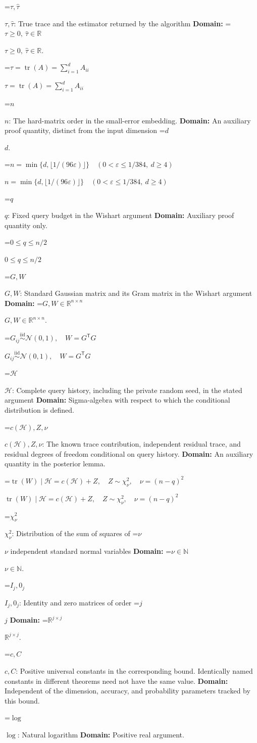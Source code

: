 \documentclass[10pt,a4paper]{article}
\newcommand{\AtlasMath}[1]{\par\begingroup\centering\setbox0=\hbox{$\displaystyle #1$}\ifdim\wd0>1.4\linewidth\typeout{ATLAS WIDE FORMULA: \the\wd0}\fi\ifdim\wd0>\linewidth\resizebox{\linewidth}{!}{\box0}\else\box0\fi\par\endgroup}
\newcommand{\AtlasInlineMath}[1]{\begingroup\setbox0=\hbox{$#1$}\ifdim\wd0>.4\linewidth\endgroup\AtlasMath{#1}\else\endgroup$#1$\fi}
\begin{document}
\AtlasInlineMath{\tau,\widehat\tau}: True trace and the estimator returned by the algorithm \textbf{Domain:} \AtlasInlineMath{\tau\ge0,\ \widehat\tau\in\mathbb R}.

\AtlasInlineMath{\tau=\operatorname{tr}(A)=\sum_{i=1}^d A_{ii}}

\AtlasInlineMath{n}: The hard-matrix order in the small-error embedding. \textbf{Domain:} An auxiliary proof quantity, distinct from the input dimension \AtlasInlineMath{d}.

\AtlasInlineMath{n=\min\{d,\lfloor1/(96\varepsilon)\rfloor\}\quad(0<\varepsilon\le1/384,\ d\ge4)}

\AtlasInlineMath{q}: Fixed query budget in the Wishart argument \textbf{Domain:} Auxiliary proof quantity only.

\AtlasInlineMath{0\le q\le n/2}

\AtlasInlineMath{G,W}: Standard Gaussian matrix and its Gram matrix in the Wishart argument \textbf{Domain:} \AtlasInlineMath{G,W\in\mathbb R^{n\times n}}.

\AtlasInlineMath{G_{ij}\stackrel{\mathrm{iid}}{\sim}\mathcal N(0,1),\quad W=G^{\mathsf T}G}

\AtlasInlineMath{\mathcal H}: Complete query history, including the private random seed, in the stated argument \textbf{Domain:} Sigma-algebra with respect to which the conditional distribution is defined.

\AtlasInlineMath{c(\mathcal H),Z,\nu}: The known trace contribution, independent residual trace, and residual degrees of freedom conditional on query history. \textbf{Domain:} An auxiliary quantity in the posterior lemma.

\AtlasInlineMath{\operatorname{tr}(W)\mid\mathcal H=c(\mathcal H)+Z,\quad Z\sim\chi^2_\nu,\quad\nu=(n-q)^2}

\AtlasInlineMath{\chi^2_\nu}: Distribution of the sum of squares of \AtlasInlineMath{\nu} independent standard normal variables \textbf{Domain:} \AtlasInlineMath{\nu\in\mathbb N}.

\AtlasInlineMath{I_j,0_j}: Identity and zero matrices of order \AtlasInlineMath{j} \textbf{Domain:} \AtlasInlineMath{\mathbb R^{j\times j}}.

\AtlasInlineMath{c,C}: Positive universal constants in the corresponding bound. Identically named constants in different theorems need not have the same value. \textbf{Domain:} Independent of the dimension, accuracy, and probability parameters tracked by this bound.

\AtlasInlineMath{\log}: Natural logarithm \textbf{Domain:} Positive real argument.
\end{document}
